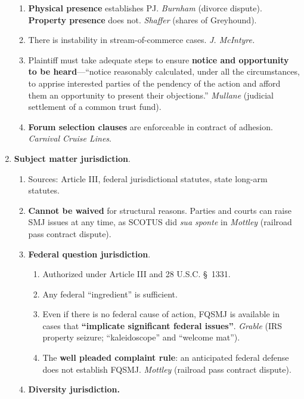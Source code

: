 \begin{enumerate}
\begin{enumerate}
        \item \textbf{Physical presence} establishes PJ. \emph{Burnham} 
        (divorce dispute). \textbf{Property presence} does not.  
        \emph{Shaffer} (shares of Greyhound).
        \item There is instability in stream-of-commerce cases. \emph{J.  
        McIntyre.}
        \item Plaintiff must take adequate steps to ensure \textbf{notice and 
        opportunity to be heard}---``notice reasonably calculated, under all 
        the circumstances, to apprise interested parties of the pendency of 
        the action and afford them an opportunity to present their 
        objections.'' \emph{Mullane} (judicial settlement of a common trust 
        fund).
        \item \textbf{Forum selection clauses} are enforceable in contract of 
        adhesion. \emph{Carnival Cruise Lines}.
    \end{enumerate}
    \item \textbf{Subject matter jurisdiction}.
    \begin{enumerate}
        \item Sources: Article III, federal jurisdictional statutes, state 
        long-arm statutes.
        \item \textbf{Cannot be waived} for structural reasons. Parties and 
        courts can raise SMJ issues at any time, as SCOTUS did \emph{sua 
        sponte} in \emph{Mottley} (railroad pass contract dispute).
        \item \textbf{Federal question jurisdiction}.
        \begin{enumerate}
            \item Authorized under Article III and 28 U.S.C. \S\ 1331.
            \item Any federal ``ingredient'' is sufficient.
            \item Even if there is no federal cause of action, FQSMJ is 
            available in cases that \textbf{``implicate significant federal 
            issues''}. \emph{Grable} (IRS property seizure; ``kaleidoscope'' 
            and ``welcome mat'').
            \item The \textbf{well pleaded complaint rule}: an anticipated 
            federal defense does not establish FQSMJ. \emph{Mottley} (railroad 
            pass contract dispute).
        \end{enumerate}
        \item \textbf{Diversity jurisdiction.}

\end{enumerate}
\end{enumerate}
